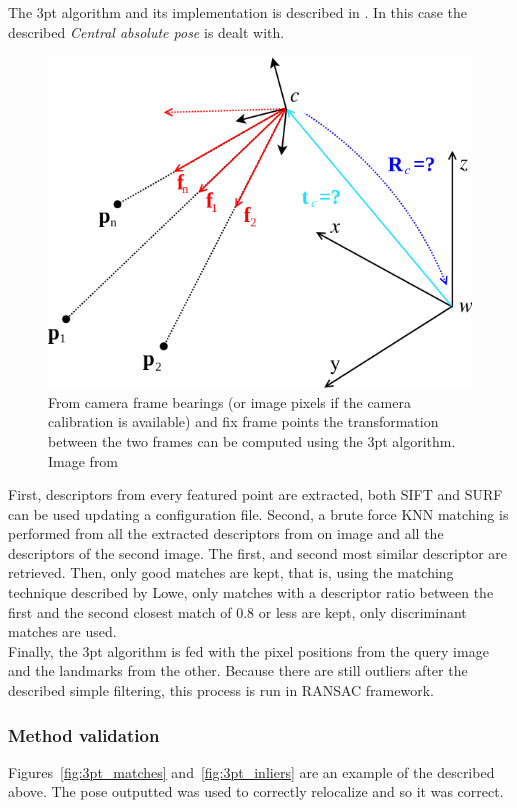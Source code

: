 The 3pt algorithm and its implementation is described in \cite{kneipopengv}. In this case the described \textit{Central absolute pose} is dealt with.

\begin{figure}[htpb]
  \centering
  \includegraphics[width=0.6\linewidth]{img/absolute_central.png}
  \caption{From camera frame bearings (or image pixels if the camera calibration is available) and fix frame points the transformation between the two frames can be computed using the 3pt algorithm. Image from \cite{kneipopengv}}
  \label{fig:img/absolute_centra}
\end{figure}

First, descriptors from every featured point are extracted, both SIFT and SURF can be used updating a configuration file. Second, a brute force KNN matching is performed from all the extracted descriptors from on image and all the descriptors of the second image. The first, and second most similar descriptor are retrieved. Then, only good matches are kept, that is, using the matching technique described by Lowe, only matches with a descriptor ratio between the first and the second closest match of 0.8 or less are kept, only discriminant matches are used.\\

Finally, the 3pt algorithm is fed with the pixel positions from the query image and the landmarks from the other. Because there are still outliers after the described simple filtering, this process is run in RANSAC framework. \\


\subsubsection{Method validation}
\label{ssub:3pt_method_validation}

Figures~\ref{fig:3pt_matches} and~\ref{fig:3pt_inliers} are an example of the described above. The pose outputted was used to correctly relocalize and so it was correct.\\

